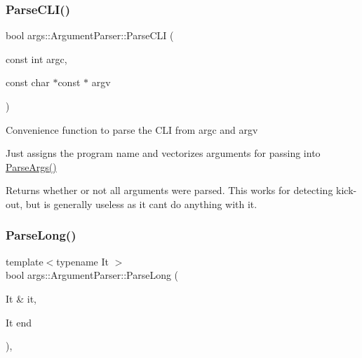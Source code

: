 \subsubsection{\texorpdfstring{Parse\+C\+L\+I()}{ParseCLI()}}
{\footnotesize\ttfamily bool args\+::\+Argument\+Parser\+::\+Parse\+C\+LI (\begin{DoxyParamCaption}\item[{const int}]{argc,  }\item[{const char $\ast$const $\ast$}]{argv }\end{DoxyParamCaption})\hspace{0.3cm}{\ttfamily [inline]}}

Convenience function to parse the C\+LI from argc and argv

Just assigns the program name and vectorizes arguments for passing into \hyperlink{classargs_1_1_argument_parser_a4bc1f3f3d000f11715fa66ade894bd9b}{Parse\+Args()}

\begin{DoxyReturn}{Returns}
whether or not all arguments were parsed. This works for detecting kick-\/out, but is generally useless as it can\textquotesingle{}t do anything with it. 
\end{DoxyReturn}
\mbox{\label{classargs_1_1_argument_parser_a3143420b4177ce05c076700308d427c2}} 
\subsubsection{\texorpdfstring{Parse\+Long()}{ParseLong()}}
{\footnotesize\ttfamily template$<$typename It $>$ \\
bool args\+::\+Argument\+Parser\+::\+Parse\+Long (\begin{DoxyParamCaption}\item[{It \&}]{it,  }\item[{It}]{end }\end{DoxyParamCaption})\hspace{0.3cm}{\ttfamily [inline]}, {\ttfamily [protected]}}

\mbox{\label{classargs_1_1_argument_parser_a68c6996f0b974924feb1294eb976edf1}} 

